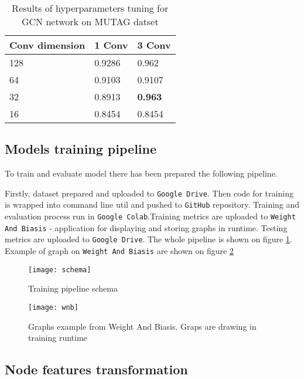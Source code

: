 \begin{table}[]
    \centering
    \begin{tabular}{|l|l|l|} \hline
    Conv dimension & 1 Conv & 3 Conv         \\ \hline 
    128            & 0.9286 & 0.962          \\ \hline
    64             & 0.9103 & 0.9107         \\ \hline
    32             & 0.8913 & \textbf{0.963} \\ \hline
    16             & 0.8454 & 0.8454    \\ \hline
    \end{tabular}
    \caption{Results of hyperparameters tuning for GCN network on MUTAG datset}
    \label{tab:hyper}
\end{table}


\subsection{Models training pipeline}


To train and evaluate model there has been prepared the following pipeline.

Firstly, dataset prepared and uploaded to \texttt{Google Drive}. Then code for training is wrapped
into command line util and pushed to \texttt{GitHub} repository. Training and evaluation process run
in \texttt{Google Colab}.Training metrics are uploaded to \texttt{Weight And Biasis} - application for displaying
and storing graphs in runtime. Testing metrics are uploaded to \texttt{Google Drive}.
The whole pipeline is shown on figure \ref{fig:pipeline}. Example of graph on  \texttt{Weight And Biasis}
are shown on figure \ref{fig:wnb}

\begin{figure}[t]
    \centering
    \texttt{[image: schema]}
    \caption{Training pipeline schema}
    \label{fig:pipeline}
\end{figure}


\begin{figure}[h]
    \centering
    \texttt{[image: wnb]}
    \caption{Graphs example from Weight And Biasis. Graps are drawing in training runtime}
    \label{fig:wnb}
\end{figure}

\subsection{Node features transformation}

